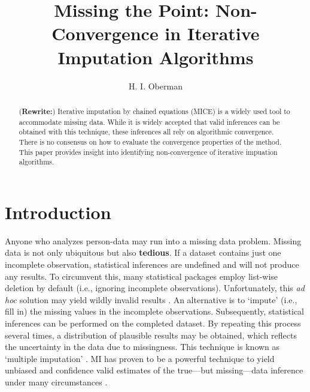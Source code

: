 \documentclass[Royal,times,sageh]{sagej}
\begin{document}
\title{Missing the Point: Non-Convergence in Iterative Imputation Algorithms}


\author{H. I. Oberman}




\begin{abstract}
(\textbf{Rewrite:}) Iterative imputation by chained equations (MICE) is
a widely used tool to accommodate missing data. While it is widely
accepted that valid inferences can be obtained with this technique,
these inferences all rely on algorithmic convergence. There is no
consensus on how to evaluate the convergence properties of the method.
This paper provides insight into identifying non-convergence of
iterative impuation algorithms.
\end{abstract}


\maketitle

\hypertarget{introduction}{%
\section{Introduction}\label{introduction}}

Anyone who analyzes person-data may run into a missing data problem.
Missing data is not only ubiquitous but also \textbf{tedious}. If a
dataset contains just one incomplete observation, statistical inferences
are undefined and will not produce any results. To circumvent this, many
statistical packages employ list-wise deletion by default (i.e.,
ignoring incomplete observations). Unfortunately, this \emph{ad hoc}
solution may yield wildly invalid results \citep{buur18}. An alternative
is to `impute' (i.e., fill in) the missing values in the incomplete
observations. Subsequently, statistical inferences can be performed on
the completed dataset. By repeating this process several times, a
distribution of plausible results may be obtained, which reflects the
uncertainty in the data due to missingness. This technique is known as
`multiple imputation' \citep[MI;][]{rubin76}. MI has proven to be a
powerful technique to yield unbiased and confidence valid estimates of
the true---but missing---data inference under many circumstances
\citep{buur18}.
\end{document}
